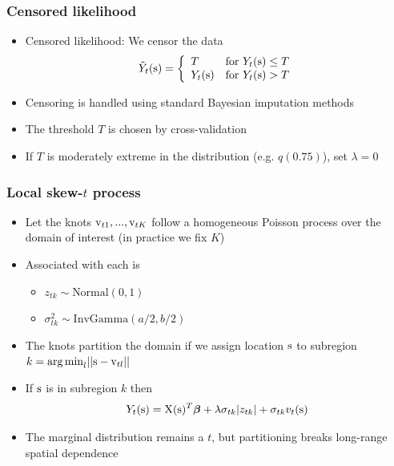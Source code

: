 \documentclass{beamer}
\newcommand{\bbeta}{ \mbox{\boldmath $\beta$}}
\newcommand{\bX}{ \mbox{\boldmath X}}
\renewcommand{\bs}{ \mbox{\boldmath s}}
\newcommand{\bv}{ \mbox{\boldmath v}}
\newcommand{\skewt}{skew-$t$ }
\newcommand{\bit}{\begin{itemize}}
\newcommand{\eit}{\end{itemize}}
\begin{document}
\begin{frame}\frametitle{Censored likelihood}
  \bit\setlength\itemsep{\fill}
  \item Censored likelihood: We censor the data
  $${\tilde Y}_t(\bs) =\left\{\begin{array}{ll}
  T & \text{for } Y_t(\bs)\le T\\
  Y_t(\bs) & \text{for } Y_t(\bs)>T
  \end{array}\right.$$
  \item Censoring is handled using standard Bayesian imputation methods
  \item The threshold $T$ is chosen by cross-validation
  \item If $T$ is moderately extreme in the distribution (e.g. $q(0.75)$), set $\lambda = 0$
  \eit
\end{frame}

\begin{frame}\frametitle{Local \skewt process}
  \bit\setlength\itemsep{\fill}
  \item Let the knots $\bv_{t1},...,\bv_{tK}$ follow a homogeneous Poisson process over the domain of interest (in practice we fix $K$)
  \item Associated with each is
  \begin{itemize}
    \item $z_{tk}\sim\mbox{Normal}(0,1)$
    \item $\sigma_{tk}^2\sim\mbox{InvGamma}(a/2,b/2)$
  \end{itemize}
  \item The knots partition the domain if we assign location $\bs$ to subregion $k=\argmin_{l}||\bs-\bv_{tl}||$
  \item If $\bs$ is in subregion $k$ then $$Y_t(\bs) = \bX(\bs)^T\bbeta +\lambda\sigma_{tk}|z_{tk}| + \sigma_{tk}v_t(\bs)\nonumber$$
  \item The marginal distribution remains a $t$, but partitioning breaks long-range spatial dependence
  \eit
\end{frame}
\end{document}
